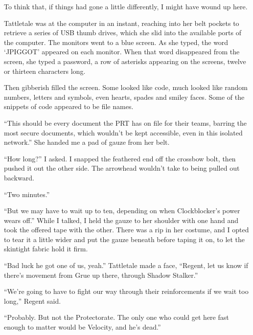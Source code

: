 To think that, if things had gone a little differently, I might have wound up here.



Tattletale was at the computer in an instant, reaching into her belt pockets to retrieve a series of USB thumb drives, which she slid into the available ports of the computer.  The monitors went to a blue screen.  As she typed, the word `JPIGGOT' appeared on each monitor.  When that word disappeared from the screen, she typed a password, a row of asterisks appearing on the screens, twelve or thirteen characters long.



Then gibberish filled the screen.  Some looked like code, much looked like random numbers, letters and symbols, even hearts, spades and smiley faces.  Some of the snippets of code appeared to be file names.



``This should be every document the PRT has on file for their teams, barring the most secure documents, which wouldn't be kept accessible, even in this isolated network.''  She handed me a pad of gauze from her belt.



``How long?'' I asked.  I snapped the feathered end off the crossbow bolt, then pushed it out the other side.  The arrowhead wouldn't take to being pulled out backward.



``Two minutes.''



``But we may have to wait up to ten, depending on when Clockblocker's power wears off.''  While I talked, I held the gauze to her shoulder with one hand and took the offered tape with the other.  There was a rip in her costume, and I opted to tear it a little wider and put the gauze beneath before taping it on, to let the skintight fabric hold it firm.



``Bad luck he got one of us, yeah.''  Tattletale made a face, ``Regent, let us know if there's movement from Grue up there, through Shadow Stalker.''



``We're going to have to fight our way through their reinforcements if we wait too long,'' Regent said.



``Probably.  But not the Protectorate.  The only one who could get here fast enough to matter would be Velocity, and he's dead.''



